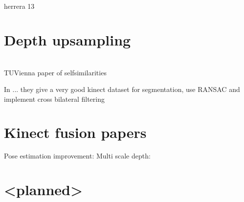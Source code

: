 \documentclass{ucl_thesis}
\begin{document}
herrera 13





\section{Depth upsampling}
\citep{MatsuoFI13} \\
\citep{} TUVienna paper of selfsimilarities

In \citep{Silberman:ECCV12} ... they give a very good kinect dataset for segmentation, use RANSAC and implement cross bilateral filtering

\section{Kinect fusion papers}
\label{sec:kinfu}

\citep{Zhou:2013}
\citep{Chen:2013:Scalable_volumetric}
\citep{Whelan13iros}
\citep{Whelan12rssw}

Pose estimation improvement: \citep{Whelan13icra}
Multi scale depth: \citep{Fuhrmann:2011}

\section{<planned>}
\end{document}
